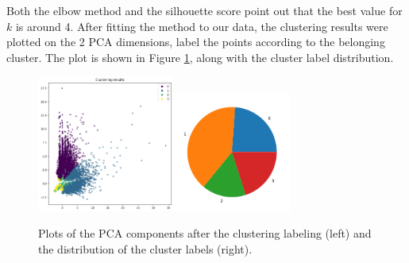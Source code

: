 \documentclass[10pt,a4paper]{report}
\begin{document}
Both the elbow method and the silhouette score point out that the best value for $k$ is around 4.
After fitting the method to our data, the clustering results were plotted on the 2 PCA dimensions, label the points according to the belonging cluster.
The plot is shown in Figure \ref{kmeans_pca}, along with the cluster label distribution.
\begin{figure}[h]
	\centering
	\includegraphics[width=0.4\textwidth]{kmeans_pca}\includegraphics[width=0.35\textwidth]{kmeans_pie}
	\caption{Plots of the PCA components after the clustering labeling (left) and the distribution of the cluster labels (right).}
	\label{kmeans_pca}
\end{figure}
\end{document}
